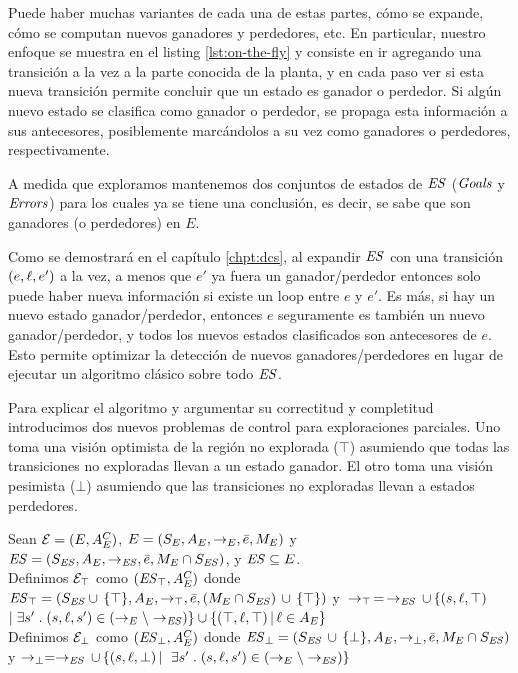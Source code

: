 Puede haber muchas variantes de cada una de estas partes, cómo se expande, cómo se computan nuevos ganadores y perdedores, etc. En particular, nuestro enfoque se muestra en el listing \ref{lst:on-the-fly} y consiste en ir agregando una transición a la vez a la parte conocida de la planta, y en cada paso ver si esta nueva transición permite concluir que un estado es ganador o perdedor. Si algún nuevo estado se clasifica como ganador  o perdedor, se propaga esta información a sus antecesores, posiblemente marcándolos a su vez como ganadores o perdedores, respectivamente.

A medida que exploramos mantenemos dos conjuntos de estados de $\mathit{ES}$ ($\mathit{Goals}$ y $\mathit{Errors}$) para los cuales ya se tiene una conclusión, es decir, se sabe que son ganadores (o perdedores) en $E$.

Como se demostrará en el capítulo \ref{chpt:dcs}, al expandir $\mathit{ES}$ con una transición $(e,\ell,e')$ a la vez, a menos que $e'$ ya fuera un ganador/perdedor entonces solo puede haber nueva información si existe un loop entre $e$ y $e'$. Es más, si hay un nuevo estado ganador/perdedor, entonces $e$ seguramente es también un nuevo ganador/perdedor, y todos los nuevos estados clasificados son antecesores de $e$. Esto permite optimizar la detección de nuevos ganadores/perdedores en lugar de ejecutar un algoritmo clásico sobre todo $\mathit{ES}$.




Para explicar el algoritmo y argumentar su correctitud y completitud introducimos dos nuevos problemas de control para exploraciones parciales. Uno toma una visión optimista de la región no explorada ($\top$) asumiendo que todas las transiciones no exploradas llevan a un estado ganador. El otro toma una visión pesimista ($\bot$) asumiendo que las transiciones no exploradas llevan a estados perdedores.

\begin{definition}
	 \label{def:unexploredTo}
	
	Sean $\mathcal{E} = (E, A_E^C)$, $E = (S_E,A_E,\rightarrow_E,\bar{e},M_E)$ y $\mathit{ES} = 
	(S_{\mathit{ES}},A_E, \rightarrow_{\mathit{ES}},\bar{e},M_E \cap S_{\mathit{ES}})$, y $\mathit{ES} 
	\subseteq E$.
	\\
	Definimos $\mathcal{E}_\top$ como $(\mathit{{\mathit{ES}}_{\top}}, A_E^C)$ donde 
	$\mathit{{\mathit{ES}}_{\top}} = (S_{\mathit{ES}} \cup \, \{\top\},A_E,\rightarrow_\top, 
	\bar{e}, 
	(M_E \cap S_{\mathit{ES}})\, \cup \, \{\top\})$ y $\, \rightarrow_\top \, = \, \rightarrow_{\mathit{ES}} 
	\, 
	\cup\, \{(s,\ell, \top) 
	\;$ $ | \; \exists s' \;.\; (s, \ell, s') \in (\rightarrow_E \setminus \rightarrow_{\mathit{ES}})\} \cup \{(\top, \ell, \top) \, | \, \ell \in A_E\}$ \\
	Definimos $\mathcal{E}_\bot$ como $(\mathit{{\mathit{ES}}_{\bot}}, A_E^C)$ donde 
	$\mathit{{\mathit{ES}}_{\bot}} = (S_{\mathit{ES}} \, \cup \, 
	\{\bot\},A_E,\rightarrow_\bot, 
	\bar{e}, M_E \cap S_{\mathit{ES}})$ y $\rightarrow_\bot = \rightarrow_{\mathit{ES}} \, \cup \, \{(s,\ell, 
	\bot) \, | \, $ $ \exists s' \;.\; (s, \ell, s') \in (\rightarrow_E \setminus \rightarrow_{\mathit{ES}})\}$ 
\end{definition}

